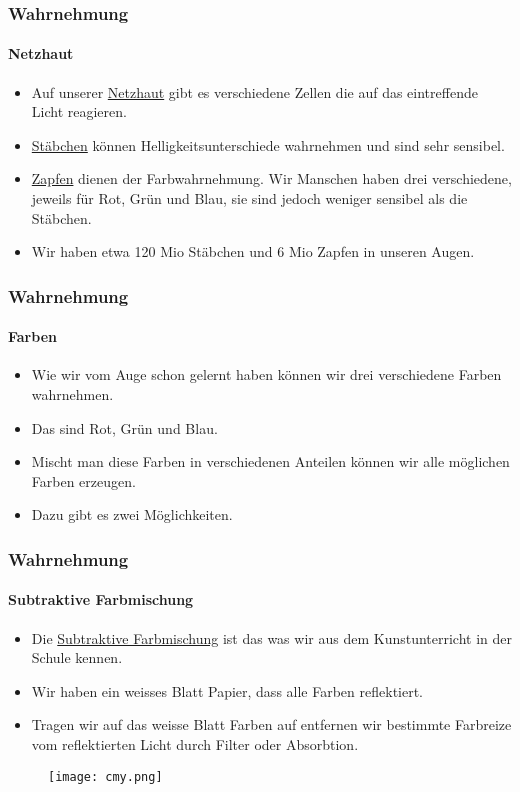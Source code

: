 \begin{frame}
    \frametitle{Wahrnehmung}
    \framesubtitle{Netzhaut}
        \begin{itemize}
            \item Auf unserer \href{https://de.wikipedia.org/wiki/Netzhaut}{Netzhaut} gibt es verschiedene Zellen die auf das eintreffende Licht reagieren.
            \item \href{https://de.wikipedia.org/wiki/St\%C3\%A4bchen_(Auge)}{Stäbchen} können Helligkeitsunterschiede wahrnehmen und sind sehr sensibel.
            \item \href{https://de.wikipedia.org/wiki/Zapfen_(Auge)}{Zapfen} dienen der Farbwahrnehmung. Wir Manschen haben drei verschiedene, jeweils für Rot, Grün und Blau, sie sind jedoch weniger sensibel als die Stäbchen.
            \item Wir haben etwa 120 Mio Stäbchen und 6 Mio Zapfen in unseren Augen.
        \end{itemize}
\end{frame}

\begin{frame}
    \frametitle{Wahrnehmung}
    \framesubtitle{Farben}
        \begin{itemize}
            \item Wie wir vom Auge schon gelernt haben können wir drei verschiedene Farben wahrnehmen.
            \item Das sind Rot, Grün und Blau.
            \item Mischt man diese Farben in verschiedenen Anteilen können wir alle möglichen Farben erzeugen.
            \item Dazu gibt es zwei Möglichkeiten.
        \end{itemize}
\end{frame}

\begin{frame}
    \frametitle{Wahrnehmung}
    \framesubtitle{Subtraktive Farbmischung}
    \begin{minipage}{0.5\textwidth}
        \begin{itemize}
            \item Die \href{https://de.wikipedia.org/wiki/Subtraktive_Farbmischung}{Subtraktive Farbmischung} ist das was wir aus dem Kunstunterricht in der Schule kennen.
            \item Wir haben ein weisses Blatt Papier, dass alle Farben reflektiert.
            \item Tragen wir auf das weisse Blatt Farben auf entfernen wir bestimmte Farbreize vom reflektierten Licht durch Filter oder Absorbtion.
        \end{itemize}
    \end{minipage} \hfill
    \begin{minipage}{0.45\textwidth}
        \begin{figure}
            \texttt{[image: cmy.png]}
        \end{figure}
    \end{minipage}
\end{frame}

